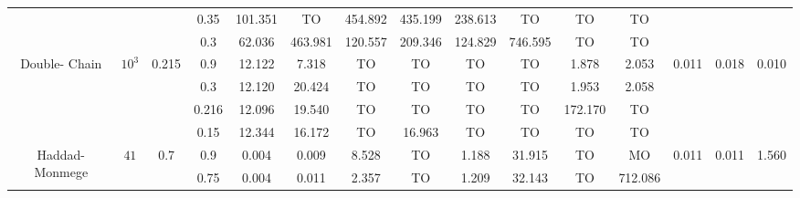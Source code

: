 \begin{sidewaystable}
\begin{lrbox}{\lstbox}
\begin{minipage}{\textheight}
\begin{tabular}{ccccccccccccccc}
				                                               &                            &                           & \cellcolor{gray!25}0.35  & 101.351     & TO           & 454.892     & 435.199  & 238.613 & TO      & TO      & TO                                                                                               \\
				                                               &                            &                           & \cellcolor{gray!25}0.3   & 62.036      & 463.981      & 120.557     & 209.346  & 124.829 & 746.595 & TO      & TO                                                                                               \\
				\midrule
				\multirow{4}{*}{\parbox{4em}{Double- Chain}}   & \multirow{4}{*}{$10^3$}    & \multirow{4}{*}{0.215}    & 0.9                      & 12.122      & 7.318        & TO          & TO       & TO      & TO      & 1.878   & 2.053   & \multirow{4}{*}{0.011}             & \multirow{4}{*}{0.018}   & \multirow{4}{*}{0.010} \\
				                                               &                            &                           & 0.3                      & 12.120      & 20.424       & TO          & TO       & TO      & TO      & 1.953   & 2.058                                                                                            \\
				                                               &                            &                           & 0.216                    & 12.096      & 19.540       & TO          & TO       & TO      & TO      & 172.170 & TO                                                                                               \\
				                                               &                            &                           & \cellcolor{gray!25}0.15  & 12.344      & 16.172       & TO          & 16.963   & TO      & TO      & TO      & TO                                                                                               \\
				\midrule
				\multirow{4}{*}{\parbox{4em}{Haddad- Monmege}} & \multirow{2}{*}{$41$}      & \multirow{2}{*}{0.7}      & 0.9                      & 0.004       & 0.009        & 8.528       & TO       & 1.188   & 31.915  & TO      & MO      & \multirow{2}{*}{0.011}             & \multirow{2}{*}{0.011}   & \multirow{2}{*}{1.560} \\
				                                               &                            &                           & 0.75                     & 0.004       & 0.011        & 2.357       & TO       & 1.209   & 32.143  & TO      & 712.086                                                                                          \\

\end{tabular}
\end{minipage}
\end{lrbox}
\end{sidewaystable}
